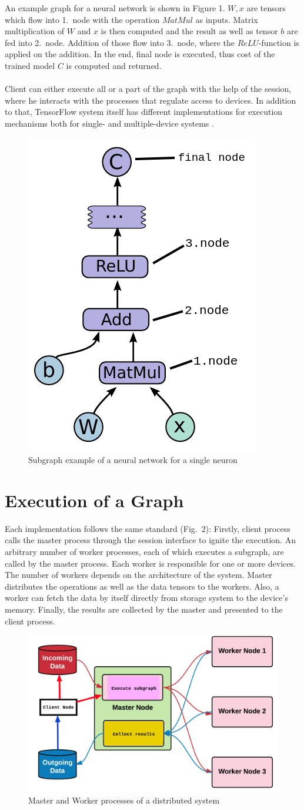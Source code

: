 \documentclass[ieeetran]{article}
\begin{document}
An example graph for a neural network is shown in Figure 1. $W, x$ are tensors which flow into 1.\ node with the operation $MatMul$ as inputs. Matrix multiplication of $W$ and $x$ is then computed and the result as well as tensor $b$ are fed into 2.\ node. Addition of those flow into 3.\ node, where the $ReLU$-function is applied on the addition. In the end, final node is executed, thus cost of the trained model $C$ is computed and returned.
\\ \\Client can either execute all or a part of the graph with the help of the session, where he interacts with the processes that regulate access to devices. In addition to that, TensorFlow system itself has different implementations for execution mechanisms both for single- and multiple-device systems \cite{first}.
\begin{figure}[h!]
  \centering
   \includegraphics[width=0.25\linewidth]{graph}
\caption[placeholder]{Subgraph example of a neural network for a single neuron\footnotemark}
  \label{fig:graph_caption_placeholder_subgraph_example_for_a_neural_networkfootnotemark}
\end{figure}
\section{Execution of a Graph} %
\label{sec:execution_of_a_graph}
Each implementation follows the same standard (Fig.\ 2): Firstly, client process calls the master process through the session interface to ignite the execution. An arbitrary number of worker processes, each of which executes a subgraph, are called by the master process. Each worker is responsible for one or more devices. The number of workers depends on the architecture of the system. Master distributes the operations as well as the data tensors to the workers. Also, a worker can fetch the data by itself directly from storage system to the device's memory. Finally, the results are collected by the master and presented to the client process.
\begin{figure}[h!]
  \centering
\includegraphics[width=0.5\linewidth]{executionofgraph}
 \caption[placeholder]{Master and Worker processes of a distributed system\footnotemark} 
  \label{fig:executionofgraph}
\end{figure}
\end{document}
